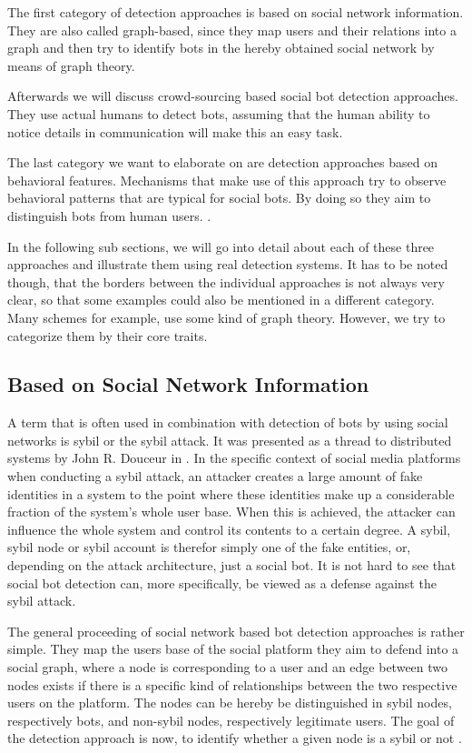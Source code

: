 The first category of detection approaches is based on social network information. They are also called graph-based, since they map users and their relations into a graph and then try to identify bots in the hereby obtained social network by means of graph theory. 

Afterwards we will discuss crowd-sourcing based social bot detection approaches. They use actual humans to detect bots, assuming that the human ability to notice details in communication will make this an easy task.

The last category we want to elaborate on are detection approaches based on behavioral features. Mechanisms that make use of this approach try to observe behavioral patterns that are typical for social bots. By doing so they aim to distinguish bots from human users. \cite{ferrara15}. %


In the following sub sections, we will go into detail about each of these three approaches and illustrate them using real detection systems. It has to be noted though, that the borders between the individual approaches is not always very clear, so that some examples could also be mentioned in a different category. Many schemes for example, use some kind of graph theory. However, we try to categorize them by their core traits.

\subsection{Based on Social Network Information}
A term that is often used in combination with detection of bots by using social networks is sybil or the sybil attack. It was presented as a thread to distributed systems by John R. Douceur in \cite{sybil}. In the specific context of social media platforms when conducting a sybil attack, an attacker creates a large amount of fake identities in a system to the point where these identities make up a considerable fraction of the system's whole user base. When this is achieved, the attacker can influence the whole system and control its contents to a certain degree. A sybil, sybil node or sybil account is therefor simply one of the fake entities, or, depending on the attack architecture, just a social bot. It is not hard to see that social bot detection can, more specifically, be viewed as a defense against the sybil attack.   

The general proceeding of social network based bot detection approaches is rather simple. They map the users base of the social platform they aim to defend into a social graph, where a node is corresponding to a user and an edge between two nodes exists if there is a specific kind of relationships between the two respective users on the platform. The nodes can be hereby be distinguished in sybil nodes, respectively bots, and non-sybil nodes, respectively legitimate users. The goal of the detection approach is now, to identify whether a given node is a sybil or not \cite{comparison}.

